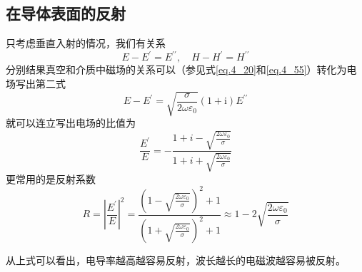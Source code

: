    \subsection{在导体表面的反射}
        只考虑垂直入射的情况，我们有关系\[E - E^\prime = E^{\prime \prime}, \quad H- H^\prime=H^{\prime \prime}\]分别结果真空和介质中磁场的关系可以（参见式\ref{eq.4_20}和\ref{eq.4_55}）转化为电场写出第二式\[E-E^{\prime}=\sqrt{\frac{\sigma}{2 \omega \varepsilon_{0}}}(1+\mathrm{i}) E^{\prime \prime}\]就可以连立写出电场的比值为
        \begin{equation}
            \frac{E^\prime}{E} = -\frac{1+i-\sqrt{\frac{2 \omega \varepsilon_0}{\sigma}}}{1+i+\sqrt{\frac{2 \omega \varepsilon_0}{\sigma}}}
        \end{equation}
        更常用的是反射系数
        \begin{equation}
            R=\left|\frac{E^{\prime}}{E}\right|^{2}=\frac{\left(1-\sqrt{\frac{2 \omega \varepsilon_{0}}{\sigma}}\right)^{2}+1}{\left(1+\sqrt{\frac{2 \omega \varepsilon_{0}}{\sigma}}\right)^{2}+1} \approx 1-2 \sqrt{\frac{2 \omega \varepsilon_{0}}{\sigma}}
        \end{equation}

        从上式可以看出，电导率越高越容易反射，波长越长的电磁波越容易被反射。